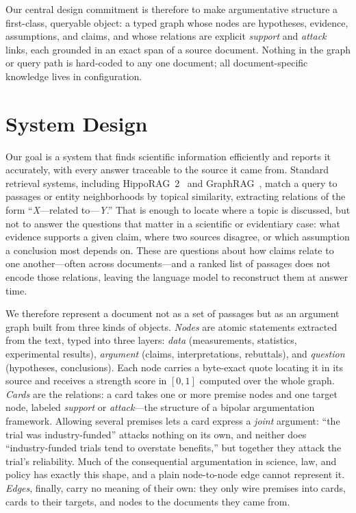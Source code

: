 \documentclass{article}
\begin{document}
Our central design commitment is therefore to make argumentative structure a
first-class, queryable object: a typed graph whose nodes are hypotheses, evidence,
assumptions, and claims, and whose relations are explicit \emph{support} and
\emph{attack} links, each grounded in an exact span of a source document. Nothing in the graph or query path is hard-coded to any one document; all
document-specific knowledge lives in configuration.

\section{System Design}

Our goal is a system that finds scientific information efficiently and reports
it accurately, with every answer traceable to the source it came from. Standard
retrieval systems, including HippoRAG~2~\cite{gutierrez2025rag} and GraphRAG~\cite{edge2024graphrag}, match a query to passages
or entity neighborhoods by topical similarity, extracting relations of the form
``\emph{X}---related to---\emph{Y}.'' That is enough to locate where a topic is
discussed, but not to answer the questions that matter in a scientific or
evidentiary case: what evidence supports a given claim, where two sources
disagree, or which assumption a conclusion most depends on. These are questions
about how claims relate to one another---often across documents---and a ranked
list of passages does not encode those relations, leaving the language model to
reconstruct them at answer time.

We therefore represent a document not as a set of passages but as an argument
graph built from three kinds of objects. \emph{Nodes} are atomic statements
extracted from the text, typed into three layers: \emph{data} (measurements,
statistics, experimental results), \emph{argument} (claims, interpretations,
rebuttals), and \emph{question} (hypotheses, conclusions). Each node carries a
byte-exact quote locating it in its source and receives a strength score in
$[0,1]$ computed over the whole graph. \emph{Cards} are the relations: a card
takes one or more premise nodes and one target node, labeled \emph{support} or
\emph{attack}---the structure of a bipolar argumentation framework.
Allowing several premises lets a card express a \emph{joint} argument:
``the trial was industry-funded'' attacks nothing on its own, and neither does
``industry-funded trials tend to overstate benefits,'' but together they attack
the trial's reliability. Much of the consequential argumentation in science,
law, and policy has exactly this shape, and a plain node-to-node edge cannot
represent it. \emph{Edges}, finally, carry no meaning of their own: they only
wire premises into cards, cards to their targets, and nodes to the documents
they came from.
\end{document}
